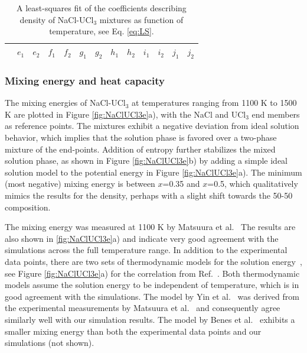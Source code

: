 \documentclass[preprint,3p,10pt,onecolumn,number,sort&compress]{elsarticle}
\begin{document}
\begin{table}[hb!]
\centering
\begin{tabular}{lcccccccccccc}
\hline
\hline
&$e_1$ &$e_2$ &$f_1$ &$f_2$ &$g_1$ &$g_2$ &$h_1$ &$h_2$ &$i_1$ &$i_2$ &$j_1$ &$j_2$ \\
\hline
\hline
\end{tabular}
\caption{A least-squares fit of the coefficients describing density of NaCl-UCl$_3$ mixtures as function of temperature, see Eq. \ref{eq:LS}.}%
\label{table:LS}
\end{table}

\subsubsection{Mixing energy and heat capacity}
The mixing energies of NaCl-UCl$_3$ at temperatures ranging from 1100 K to 1500 K are plotted in Figure \ref{fig:NaClUCl3e}a), with the NaCl and UCl$_3$ end members as reference points. The mixtures exhibit a negative deviation from ideal solution behavior, which implies that the solution phase is favored over a two-phase mixture of the end-points. Addition of entropy further stabilizes the mixed solution phase, as shown in Figure \ref{fig:NaClUCl3e}b) by adding a simple ideal solution model to the potential energy in Figure \ref{fig:NaClUCl3e}a).
 The minimum (most negative) mixing energy is between $x$=0.35 and  $x$=0.5, which qualitatively mimics the results for the density, perhaps with a slight shift towards the 50-50 composition. %
 
 The mixing energy was measured at 1100 K by Matsuura et al.~\cite{Matsuura} The results are also shown in \ref{fig:NaClUCl3e}a) and indicate very good agreement with the simulations across the full temperature range. In addition to the experimental data points, there are two sets of thermodynamic models for the solution energy~\cite{BENES2008,YIN2020}, see Figure \ref{fig:NaClUCl3e}a) for the correlation from Ref.~\cite{YIN2020}. Both thermodynamic models assume the solution energy to be independent of temperature, which is in good agreement with the simulations. The model by Yin et al.~\cite{YIN2020} was derived from the experimental measurements by Matsuura et al.~\cite{Matsuura} and consequently agree similarly well with our simulation results. The model by Benes et al.~\cite{BENES2008} exhibits a smaller mixing energy than both the experimental data points and our simulations (not shown). 
\end{document}
